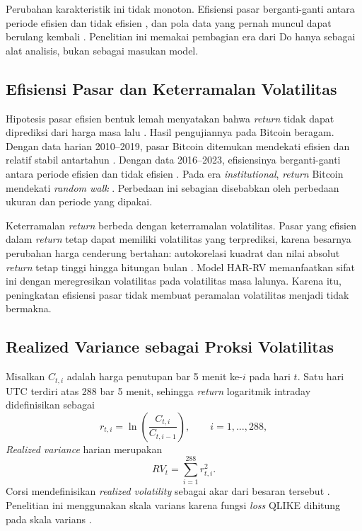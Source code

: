Perubahan karakteristik ini tidak monoton. Efisiensi pasar berganti-ganti
antara periode efisien dan tidak efisien \cite{mokni2024}, dan pola data yang
pernah muncul dapat berulang kembali \cite{suarez2023}. Penelitian ini memakai
pembagian era dari Do hanya sebagai alat analisis, bukan sebagai masukan
model.

\subsection{Efisiensi Pasar dan Keterramalan Volatilitas}
Hipotesis pasar efisien bentuk lemah menyatakan bahwa \textit{return} tidak
dapat diprediksi dari harga masa lalu \cite{yi2023}. Hasil pengujiannya pada
Bitcoin beragam. Dengan data harian 2010--2019, pasar Bitcoin ditemukan
mendekati efisien dan relatif stabil antartahun \cite{yi2023}. Dengan data
2016--2023, efisiensinya berganti-ganti antara periode efisien dan tidak
efisien \cite{mokni2024}. Pada era \textit{institutional}, \textit{return}
Bitcoin mendekati \textit{random walk} \cite{do2026}. Perbedaan ini sebagian
disebabkan oleh perbedaan ukuran dan periode yang dipakai.

Keterramalan \textit{return} berbeda dengan keterramalan volatilitas. Pasar
yang efisien dalam \textit{return} tetap dapat memiliki volatilitas yang
terprediksi, karena besarnya perubahan harga cenderung bertahan:
autokorelasi kuadrat dan nilai absolut \textit{return} tetap tinggi hingga
hitungan bulan \cite{corsi2009}. Model HAR-RV memanfaatkan sifat ini dengan
meregresikan volatilitas pada volatilitas masa lalunya. Karena itu,
peningkatan efisiensi pasar tidak membuat peramalan volatilitas menjadi tidak
bermakna.

\subsection{Realized Variance sebagai Proksi Volatilitas}
\label{subsec:rv}
Misalkan $C_{t,i}$ adalah harga penutupan bar 5 menit ke-$i$ pada hari $t$.
Satu hari UTC terdiri atas 288 bar 5 menit, sehingga \textit{return}
logaritmik intraday didefinisikan sebagai
\begin{equation}
  r_{t,i} = \ln\!\left(\frac{C_{t,i}}{C_{t,i-1}}\right),
  \qquad i = 1, \dots, 288,
  \label{eq:return}
\end{equation}
\textit{Realized variance} harian merupakan
\begin{equation}
  RV_t = \sum_{i=1}^{288} r_{t,i}^2 .
  \label{eq:rv}
\end{equation}
Corsi mendefinisikan \textit{realized volatility} sebagai akar dari besaran
tersebut \cite{corsi2009}. Penelitian ini menggunakan skala varians karena
fungsi \textit{loss} QLIKE dihitung pada skala varians \cite{patton2011}.

